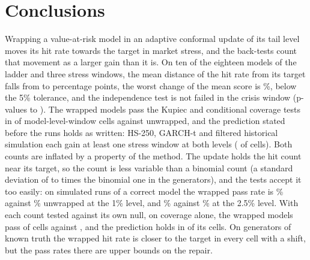 \section{Conclusions}
\label{sec:conclusions}

Wrapping a value-at-risk model in an adaptive conformal update of its tail level moves its hit rate towards the target in market stress, and the back-tests count that movement as a larger gain than it is. On ten of the eighteen models of the ladder and three stress windows, the mean distance of the hit rate from its target falls from \tenHitDevUnw{} to \tenHitDevAci{} percentage points, the worst change of the mean score is \tenWorstFz\%, below the 5\% tolerance, and the independence test is not failed in the crisis window (p-values \indMin{} to \indMax{}). The wrapped models pass the Kupiec and conditional coverage tests in \tenPassAci{} of \tenRuns{} model-level-window cells against \tenPassUnw{} unwrapped, and the prediction stated before the runs holds as written: HS-250, GARCH-t and filtered historical simulation each gain at least one stress window at both levels (\hypCellsHold{} of \hypCells{} cells). Both counts are inflated by a property of the method. The update holds the hit count near its target, so the count is less variable than a binomial count (a standard deviation of \dispRatioAciMin{} to \dispRatioAciMax{} times the binomial one in the generators), and the tests accept it too easily: on simulated runs of a correct model the wrapped pass rate is \dispBOneOneAciPass\% against \dispBOneOneUnwPass\% unwrapped at the 1\% level, and \dispBTwoHalfOneAciPass\% against \dispBTwoHalfOneUnwPass\% at the 2.5\% level. With each count tested against its own null, on coverage alone, the wrapped models pass \dispCWrapCal{} of \dispCCells{} cells against \dispCUnwExact{}, and the prediction holds in \dispCHoneGainCal{} of its \hypCells{} cells. On generators of known truth the wrapped hit rate is closer to the target in every cell with a shift, but the pass rates there are upper bounds on the repair.

